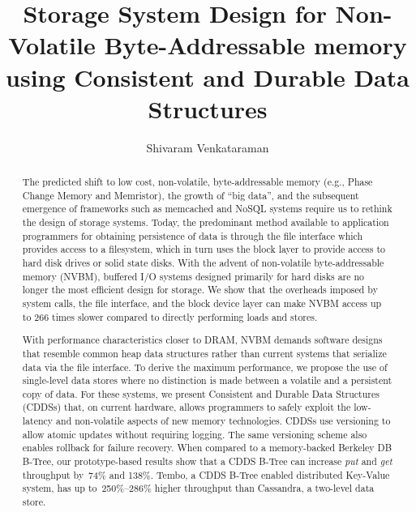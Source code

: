 \documentclass[edeposit,10pt,fullpage]{uiucthesis2009}
\begin{document}
\title{Storage System Design for Non-Volatile Byte-Addressable memory using Consistent and Durable Data Structures}
\author{Shivaram Venkataraman}
\msthesis
{}
\maketitle

\frontmatter

\begin{abstract}
The predicted shift to low cost, non-volatile, byte-addressable memory (e.g.,
Phase Change Memory and Memristor), the growth of ``big data'', and the
subsequent emergence of frameworks such as memcached and NoSQL systems require
us to rethink the design of storage systems.  Today, the predominant method
available to application programmers for obtaining persistence of data is
through the file interface which provides access to a filesystem, which in turn
uses the block layer to provide access to hard disk drives or solid state
disks.  With the advent of non-volatile byte-addressable memory (NVBM),
buffered I/O systems designed primarily for hard disks are no longer the most
efficient design for storage.  We show that the overheads imposed by system
calls, the file interface, and the block device layer can make NVBM access up
to 266 times slower compared to directly performing loads and stores.

With performance characteristics closer to DRAM, NVBM demands software designs
that resemble common heap data structures rather than current systems that
serialize data via the file interface. To derive the maximum performance, we
propose the use of single-level data stores where no distinction is made
between a volatile and a persistent copy of data. For these systems, we present
Consistent and Durable Data Structures (CDDSs) that, on current hardware,
allows programmers to safely exploit the low-latency and non-volatile aspects
of new memory technologies.  CDDSs use versioning to allow atomic updates
without requiring logging.  The same versioning scheme also enables rollback
for failure recovery.  When compared to a memory-backed Berkeley DB B-Tree, our
prototype-based results show that a CDDS B-Tree can increase \textit{put} and
\textit{get} throughput by~74\% and 138\%. Tembo, a CDDS B-Tree enabled
distributed Key-Value system, has up to~250\%--286\% higher throughput than
Cassandra, a two-level data store.



\end{abstract}
\end{document}
